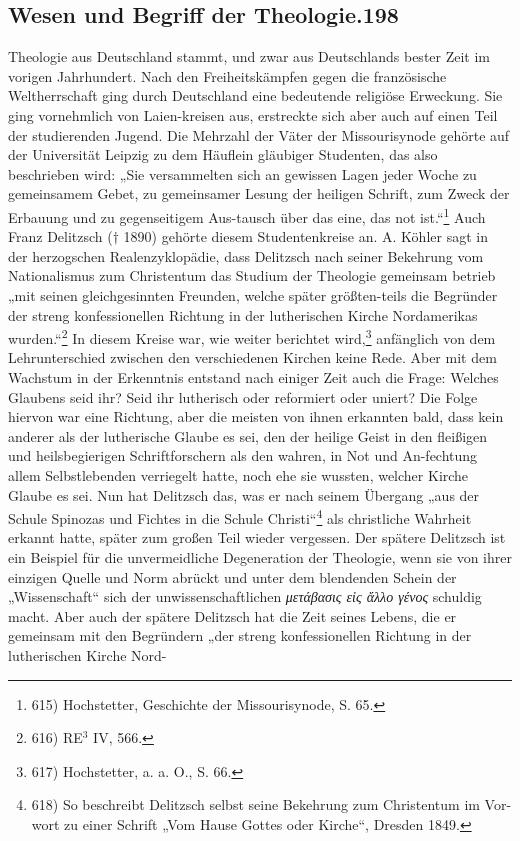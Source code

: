 \subsection*{Wesen und Begriff der Theologie.\hfill 198}
Theologie aus Deutschland stammt, und zwar aus Deutschlands bester Zeit im vorigen Jahrhundert. Nach den Freiheitskämpfen gegen die französische Weltherrschaft ging durch Deutschland eine bedeutende religiöse Erweckung. Sie ging vornehmlich von Laien-kreisen aus, erstreckte sich aber auch auf einen Teil der studierenden Jugend. Die Mehrzahl der Väter der Missourisynode gehörte auf der Universität Leipzig zu dem Häuflein gläubiger Studenten, das also beschrieben wird: „Sie versammelten sich an gewissen Lagen jeder Woche zu gemeinsamem Gebet, zu gemeinsamer Lesung der heiligen Schrift, zum Zweck der Erbauung und zu gegenseitigem Aus-tausch über das eine, das not ist.“\footnote{615) Hochstetter, Geschichte der Missourisynode, S. 65.} Auch Franz Delitzsch ($\dagger$ 1890) gehörte diesem Studentenkreise an. A. Köhler sagt in der herzogschen Realenzyklopädie, dass Delitzsch nach seiner Bekehrung vom Nationalismus zum Christentum das Studium der Theologie gemeinsam betrieb „mit seinen gleichgesinnten Freunden, welche später größten-teils die Begründer der streng konfessionellen Richtung in der lutherischen Kirche Nordamerikas wurden.“\footnote{616) RE$^3$ IV, 566.} In diesem Kreise war, wie weiter berichtet wird,\footnote{617) Hochstetter, a. a. O., S. 66.} anfänglich von dem Lehrunterschied zwischen den verschiedenen Kirchen keine Rede. Aber mit dem Wachstum in der Erkenntnis entstand nach einiger Zeit auch die Frage: Welches Glaubens seid ihr? Seid ihr lutherisch oder reformiert oder uniert? Die Folge hiervon war eine Richtung, aber die meisten von ihnen erkannten bald, dass kein anderer als der lutherische Glaube es sei, den der heilige Geist in den fleißigen und heilsbegierigen Schriftforschern als den wahren, in Not und An-fechtung allem Selbstlebenden verriegelt hatte, noch ehe sie wussten, welcher Kirche Glaube es sei. Nun hat Delitzsch das, was er nach seinem Übergang „aus der Schule Spinozas und Fichtes in die Schule Christi“\footnote{618) So beschreibt Delitzsch selbst seine Bekehrung zum Christentum im Vor-wort zu einer Schrift „Vom Hause Gottes oder Kirche“, Dresden 1849.} als christliche Wahrheit erkannt hatte, später zum großen Teil wieder vergessen. Der spätere Delitzsch ist ein Beispiel für die unvermeidliche Degeneration der Theologie, wenn sie von ihrer einzigen Quelle und Norm abrückt und unter dem blendenden Schein der „Wissenschaft“ sich der unwissenschaftlichen \emph{μετάβασις εἰς ἄλλο γένος} schuldig macht. Aber auch der spätere Delitzsch hat die Zeit seines Lebens, die er gemeinsam mit den Begründern „der streng konfessionellen Richtung in der lutherischen Kirche Nord-